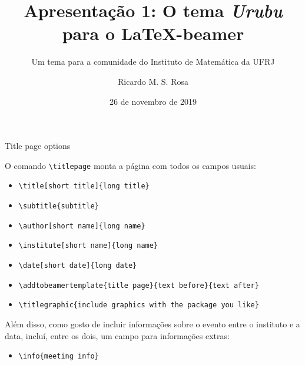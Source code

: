 \documentclass{beamer}
\title[Tema Urubu para o \LaTeX-beamer]{Apresentação 1: O tema \emph{Urubu} para o \LaTeX-beamer}
\subtitle{Um tema para a comunidade do Instituto de Matemática da UFRJ}
\author[Ricardo M S Rosa]{Ricardo M. S. Rosa}
\institute[IM-UFRJ]{Instituto de Matemática  \\ Universidade Federal do Rio de Janeiro}
\date[26/Nov/2019]{26 de novembro de 2019}
\begin{document}
\begin{frame}
  \titlepage
\end{frame}

\begin{frame}[fragile]{Title page options}

  O comando {\small\verb|\titlepage|} monta a página com todos os campos usuais:
  \begin{itemize}
    \item {\small\verb|\title[short title]{long title}|}
    \item {\small\verb|\subtitle{subtitle}|}
    \item {\small\verb|\author[short name]{long name}|}
    \item {\small\verb|\institute[short name]{long name}|}
    \item {\small\verb|\date[short date]{long date}|}
    \item {\small\verb|\addtobeamertemplate{title page}{text before}{text after}|}
    \item {\small\verb|\titlegraphic{include graphics with the package you like}|}
  \end{itemize}
  Além disso, como gosto de incluir informações sobre o evento entre o instituto e a data, incluí, entre os dois, um campo para informações extras:
  \begin{itemize}
    \item {\small\verb|\info{meeting info}|}
  \end{itemize}

\end{frame}
\end{document}
